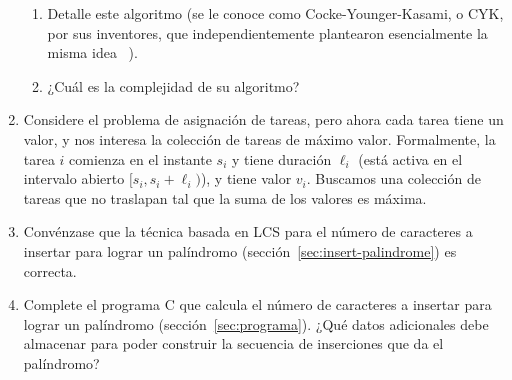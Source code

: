 \begin{enumerate}
    \begin{enumerate}
    \item
      Detalle este algoritmo
      (se le conoce como Cocke-Younger-Kasami,
       o CYK,
       por sus inventores,
       que independientemente plantearon esencialmente la misma idea~%
       \cite{cocke70:_prog_lang_compilers,
	     kasami65:_effic_recog_syntax_analy_algor,
	     younger67:_recognizing_context_free_language}).
    \item
      ¿Cuál es la complejidad de su algoritmo?
    \end{enumerate}
  \item
    Considere el problema de asignación de tareas,
    pero ahora cada tarea tiene un valor,
    y nos interesa la colección de tareas de máximo valor.
    Formalmente,
    la tarea \(i\) comienza en el instante \(s_i\) y tiene duración \(\ell_i\)
    (está activa en el intervalo abierto \([s_i, s_i + \ell_i)\)),
    y tiene valor \(v_i\).
    Buscamos una colección de tareas que no traslapan
    tal que la suma de los valores es máxima.
  \item
    Convénzase que la técnica basada en LCS
    para el número de caracteres a insertar para lograr un palíndromo
    (sección~\ref{sec:insert-palindrome})
    es correcta.
  \item
    Complete el programa C
    que calcula el número de caracteres a insertar para lograr un palíndromo
    (sección~\ref{sec:programa}).
    ¿Qué datos adicionales debe almacenar
    para poder construir la secuencia de inserciones que da el palíndromo?
  \end{enumerate}


